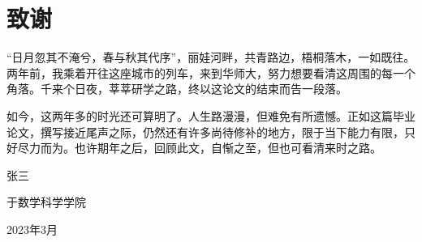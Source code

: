\documentclass[UTF8,openright]{ctexbook}
\begin{document}
\clearpage{\pagestyle{fancy}\cleardoublepage}
\chapter*{致谢}

\linespread{1.4}\selectfont


“日月忽其不淹兮，春与秋其代序”，丽娃河畔，共青路边，梧桐落木，一如既往。两年前，我乘着开往这座城市的列车，来到华师大，努力想要看清这周围的每一个角落。千来个日夜，莘莘研学之路，终以这论文的结束而告一段落。


如今，这两年多的时光还可算明了。人生路漫漫，但难免有所遗憾。正如这篇毕业论文，撰写接近尾声之际，仍然还有许多尚待修补的地方，限于当下能力有限，只好尽力而为。也许期年之后，回顾此文，自惭之至，但也可看清来时之路。



\begin{flushright}
张三

于数学科学学院

2023年3月
\end{flushright}



\iffalse  %

\clearpage{\pagestyle{fancy}\cleardoublepage}
\chapter*{研究成果}
\addcontentsline{toc}{chapter}{研究成果}

软件蓍作权：基于xxxx系统 V1.0

\fi
\end{document}
